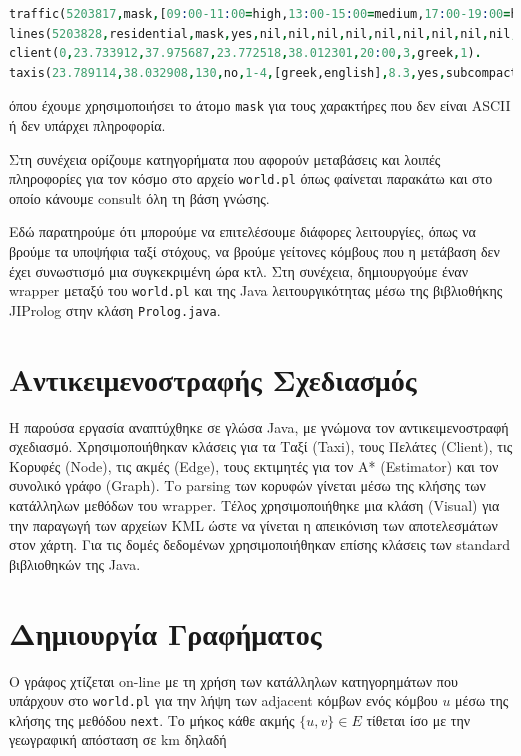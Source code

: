 \documentclass[a4paper,12pt]{article}
\begin{document}
\begin{lstlisting}[language=prolog]
traffic(5203817,mask,[09:00-11:00=high,13:00-15:00=medium,17:00-19:00=high], mask,mask).
lines(5203828,residential,mask,yes,nil,nil,nil,nil,nil,nil,nil,nil,nil,nil,nil,nil,nil,nil,mask,mask).
client(0,23.733912,37.975687,23.772518,38.012301,20:00,3,greek,1).
taxis(23.789114,38.032908,130,no,1-4,[greek,english],8.3,yes,subcompact,mask).
\end{lstlisting}  

όπου έχουμε χρησιμοποιήσει το άτομο \texttt{mask} για τους χαρακτήρες που δεν είναι ASCII ή δεν υπάρχει πληροφορία. 

Στη συνέχεια ορίζουμε κατηγορήματα που αφορούν μεταβάσεις και λοιπές πληροφορίες για τον κόσμο στο αρχείο \texttt{world.pl} όπως φαίνεται παρακάτω και στο οποίο κάνουμε consult όλη τη βάση γνώσης. 



Εδώ παρατηρούμε ότι μπορούμε να επιτελέσουμε διάφορες λειτουργίες, όπως να βρούμε τα υποψήφια ταξί στόχους, να βρούμε γείτονες κόμβους που η μετάβαση δεν έχει συνωστισμό μια συγκεκριμένη ώρα κτλ. Στη συνέχεια, δημιουργούμε έναν wrapper μεταξύ του \texttt{world.pl} και της Java λειτουργικότητας μέσω της βιβλιοθήκης JIProlog στην κλάση \texttt{Prolog.java}. 

\section{Αντικειμενοστραφής Σχεδιασμός} 

Η παρούσα εργασία αναπτύχθηκε σε γλώσα Java, με γνώμονα τον αντικειμενοστραφή σχεδιασμό. Χρησιμοποιήθηκαν κλάσεις για τα Ταξί (Taxi), τους Πελάτες (Client), τις Κορυφές (Node), τις ακμές (Edge), τους εκτιμητές για τον Α* (Estimator) και τον συνολικό γράφο (Graph). Τo parsing των κορυφών γίνεται μέσω της κλήσης των κατάλληλων μεθόδων του wrapper. Τέλος χρησιμοποιήθηκε μια κλάση (Visual) για την παραγωγή των αρχείων KML ώστε να γίνεται η απεικόνιση των αποτελεσμάτων στον χάρτη. Για τις δομές δεδομένων χρησιμοποιήθηκαν επίσης κλάσεις των standard βιβλιοθηκών της Java. 

\section{Δημιουργία Γραφήματος}

Ο γράφος χτίζεται on-line με τη χρήση των κατάλληλων κατηγορημάτων που υπάρχουν στο \texttt{world.pl} για την λήψη των adjacent κόμβων ενός κόμβου $u$ μέσω της κλήσης της μεθόδου \texttt{next}. Το μήκος κάθε ακμής $\{u, v\} \in E$ τίθεται ίσο με την γεωγραφική απόσταση σε km δηλαδή 
\end{document}

